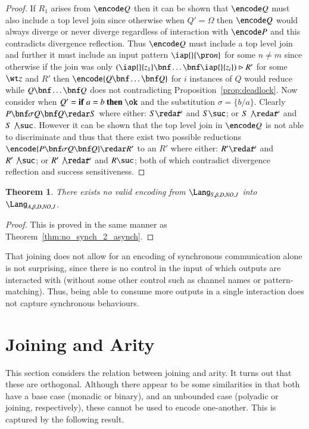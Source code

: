 \documentclass[submission,copyright,creativecommons]{eptcs}
\newtheorem{theorem}{Theorem}[section]
\newcommand{\ift}[3]{{\bf if}\ #1=#2\ {\bf then}\ #3}
\newcommand{\join}[1]{(#1)\rhd }
\begin{document}
\begin{proof}
If $R_1$ arises from $\encode Q$ then it can be shown that $\encode Q$ must also include a top level
join since otherwise when $Q'=\Omega$ then $\encode Q$ would always diverge or never diverge 
regardless of interaction with $\encode P$ and this contradicts divergence reflection.
Thus $\encode Q$ must include a top level join and further it must include an input pattern
$\iap {} {\pro n}$ for some $n\neq m$ since otherwise if the join was only
$\join{\iap {} {z_1}\bnf\ldots\bnf\iap {}{z_i}}R'$ for some $\wt z$ and $R'$ then
$\encode{Q\bnf \ldots\bnf Q}$ for $i$ instances of $Q$ would reduce while $Q\bnf \ldots\bnf Q$
does not contradicting Proposition~\ref{prop:deadlock}.
Now consider when $Q'=\ift a b \ok$ and the substitution $\sigma=\{b/a\}$.
Clearly $P\bnf \sigma Q\bnf Q\redar S$ where either:
$S\redar\!\!^\omega$ and $S\suc$; or $S\not\redar\!\!^\omega$ and $S\not\suc$.
However it can be shown that the top level join in $\encode Q$ is not able to discriminate and
thus that there exist two possible reductions $\encode{P\bnf \sigma Q\bnf Q}\redar R'$ to an $R'$
where either:
$R'\redar\!\!^\omega$ and $R'\not\suc$; or $R'\not\redar\!\!^\omega$ and $R\suc$;
both of which contradict divergence reflection and success sensitiveness.
\end{proof}

\begin{theorem}
There exists no valid encoding from $\Lang_{S,\beta,D,\mathit{NO},J}$ into $\Lang_{A,\beta,D,\mathit{NO},J}$.
\end{theorem}
\begin{proof}
This is proved in the same manner as Theorem~\ref{thm:no_synch_2_asynch}.
\end{proof}

That joining does not allow for an encoding of synchronous communication alone is not surprising,
since there is no control in the input of which outputs are interacted with (without some other
control such as channel names or pattern-matching). Thus, being able to consume more outputs in
a single interaction does not capture synchronous behaviours.



\section{Joining and Arity}
\label{sec:join_arity}

This section considers the relation between joining and arity. It turns out that these are
orthogonal.
Although there appear to be some similarities in that both have a base case (monadic or binary),
and an unbounded case (polyadic or joining, respectively), these cannot be used to encode one-another.
This is captured by the following result.
\end{document}
